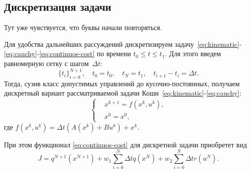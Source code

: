 \subsection{Дискретизация задачи}

{\color{red} Тут уже чувствуется, что буквы начали повторяться.}

Для удобства дальнейших рассуждений дискретизируем задачу~\eqref{eq:kinematic}-\eqref{eq:cauchy}-\eqref{eq:continuos-cost} по времени $t_0 \leqslant t \leqslant t_1$.
Для этого введем равномерную сетку с шагом~$\Delta t$:
$$
    \{ t_i \}_{i=0}^{N+1}, \quad t_0 = t_0, \quad t_N = t_1, \quad t_{i+1} - t_{i} = \Delta t.
$$
Тогда, сузив класс допустимых управлений до кусочно-постоянных, получаем дискретный вариант рассматриваемой задачи Коши~\eqref{eq:kinematic}-\eqref{eq:cauchy}:
\begin{equation}\label{eq:discrete-system}
    \left\{\begin{aligned}
        &x^{k+1} = f(x^k, u^k), \\
        &x^{0} = x^{0},
    \end{aligned}\right.
\end{equation}
где $f(x^k, u^k) = \Delta t (A(x^k) + B u^k) + x^k$.

При этом функционал \eqref{eq:continuos-cost} для дискретной задачи приобретет вид
\begin{equation}\label{eq:discrete-cost}
    J = q^{N+1}(x^{N+1}) + w_1 \sum_{i=0}^{N} \Delta t q(x^N) + w_2 \sum_{i=0}^{N} \Delta t r(u^N).
\end{equation}

